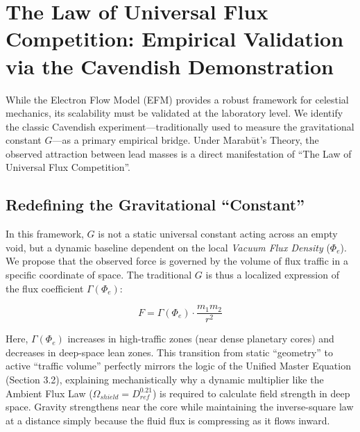 \documentclass[11pt, a4paper]{article}
\begin{document}
\section{The Law of Universal Flux Competition: Empirical Validation via the Cavendish Demonstration}

While the Electron Flow Model (EFM) provides a robust framework for celestial mechanics, its scalability must be validated at the laboratory level. We identify the classic Cavendish experiment—traditionally used to measure the gravitational constant $G$—as a primary empirical bridge. Under Marab\={u}t's Theory, the observed attraction between lead masses is a direct manifestation of ``The Law of Universal Flux Competition''.

\subsection{Redefining the Gravitational ``Constant''}
In this framework, $G$ is not a static universal constant acting across an empty void, but a dynamic baseline dependent on the local \textit{Vacuum Flux Density} ($\Phi_e$). We propose that the observed force is governed by the volume of flux traffic in a specific coordinate of space. The traditional $G$ is thus a localized expression of the flux coefficient $\Gamma(\Phi_e)$:

\begin{equation}
  F = \Gamma(\Phi_e) \cdot \frac{m_1 m_2}{r^2}
\end{equation}

Here, $\Gamma(\Phi_e)$ increases in high-traffic zones (near dense planetary cores) and decreases in deep-space lean zones. This transition from static ``geometry'' to active ``traffic volume'' perfectly mirrors the logic of the Unified Master Equation (Section 3.2), explaining mechanistically why a dynamic multiplier like the Ambient Flux Law ($\Omega_{shield} = D_{ref}^{0.21}$) is required to calculate field strength in deep space. Gravity strengthens near the core while maintaining the inverse-square law at a distance simply because the fluid flux is compressing as it flows inward.
\end{document}
